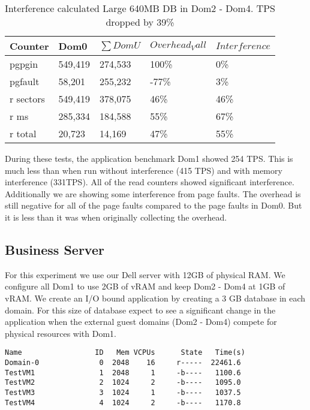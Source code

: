 \begin{table}[h]
\begin{tabular}{ l l l l p{5cm} }
  Counter & Dom0 & $\sum{DomU}$ & $Overhead_Vall$ & $Interference$ \\
  \hline
	pgpgin    & 549,419 & 274,533 & 100\% &   0\% \\
	pgfault   &  58,201 & 255,232 & -77\% &   3\% \\
	r sectors & 549,419 & 378,075 &  46\% &  46\% \\
	r ms      & 285,334 & 184,588 &  55\% &  67\% \\
	r total   &  20,723 &  14,169 &  47\% &  55\% \\
  \hline
\end{tabular}
\caption{Interference calculated Large 640MB DB in Dom2 - Dom4.  TPS dropped by 39\%}
\label{fig:InterferenceLg}
\end{table}

During these tests, the application benchmark Dom1 showed 254 TPS.  This is much less than when run without interference (415 TPS) and with memory interference (331TPS).  All of the read counters showed significant interference.  Additionally we are showing some interference from page faults.  The overhead is still negative for all of the page faults compared to the page faults in Dom0.  But it is less than it was when originally collecting the overhead.


\subsection{Business Server}
\indent For this experiment we use our Dell server with 12GB of physical RAM. We configure all Dom1 to use 2GB of vRAM and keep Dom2 - Dom4 at 1GB of vRAM. We create an I/O bound application by creating a 3 GB database in each domain. For this size of database expect to see a significant change in the application
when the external guest domains (Dom2 - Dom4) compete for physical resources with Dom1.

\begin{Verbatim}
Name                 ID   Mem VCPUs      State   Time(s)
Domain-0              0  2048    16     r-----  22461.6
TestVM1               1  2048     1     -b----   1100.6
TestVM2               2  1024     2     -b----   1095.0
TestVM3               3  1024     1     -b----   1037.5
TestVM4               4  1024     2     -b----   1170.8
\end{Verbatim}

